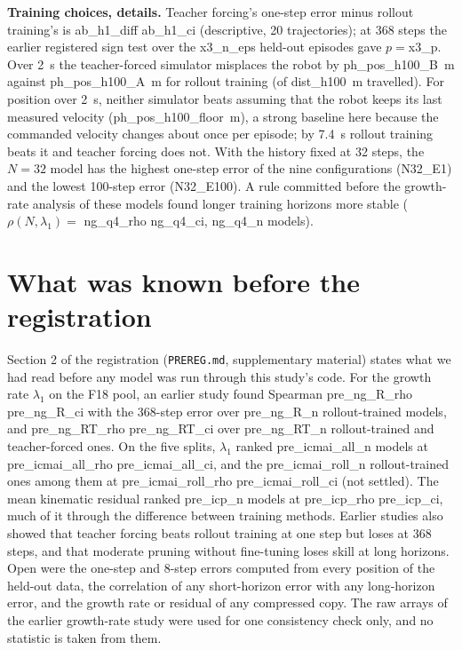 \textbf{Training choices, details.} Teacher forcing's one-step error minus rollout training's is {{ab_h1_diff}}
{{ab_h1_ci}} (descriptive, 20 trajectories); at 368 steps the earlier registered sign test over the
{{x3_n_eps}} held-out episodes gave $p={}${{x3_p}}. Over 2~s the teacher-forced simulator misplaces the robot by
{{ph_pos_h100_B}}~m against {{ph_pos_h100_A}}~m for rollout training (of {{dist_h100}}~m travelled). For position over
2~s, neither simulator beats assuming that the robot keeps its last measured velocity ({{ph_pos_h100_floor}}~m), a
strong baseline here because the commanded velocity changes about once per episode; by 7.4~s rollout training beats it
and teacher forcing does not. With the history fixed at 32 steps, the $N=32$ model has the highest one-step error of
the nine configurations ({{N32_E1}}) and the lowest 100-step error ({{N32_E100}}). A rule committed before the
growth-rate analysis of these models found longer training horizons more stable ($\rho(N,\lambda_1)=$ {{ng_q4_rho}}
{{ng_q4_ci}}, {{ng_q4_n}} models).

\FloatBarrier
\section{What was known before the registration}\label{app:A2}
Section 2 of the registration (\texttt{PREREG.md}, supplementary material) states what we had read before any model was run through this study's code.
For the growth rate $\lambda_1$ on the F18 pool, an earlier study found Spearman {{pre_ng_R_rho}} {{pre_ng_R_ci}}
with the 368-step error over {{pre_ng_R_n}} rollout-trained models, and {{pre_ng_RT_rho}} {{pre_ng_RT_ci}} over
{{pre_ng_RT_n}} rollout-trained and teacher-forced ones. On the five splits, $\lambda_1$ ranked {{pre_icmai_all_n}} models at
{{pre_icmai_all_rho}} {{pre_icmai_all_ci}}, and the {{pre_icmai_roll_n}} rollout-trained ones among them at
{{pre_icmai_roll_rho}} {{pre_icmai_roll_ci}} (not settled). The mean kinematic residual ranked {{pre_icp_n}} models at
{{pre_icp_rho}} {{pre_icp_ci}}, much of it through the difference between training methods. Earlier studies also
showed that teacher forcing beats rollout training at one step but loses at 368 steps, and that moderate pruning
without fine-tuning loses skill at long horizons.
Open were the one-step and 8-step errors computed from every position of the held-out data, the correlation of any
short-horizon error with any long-horizon error, and the growth rate or residual of any compressed copy. The raw
arrays of the earlier growth-rate study were used for one consistency check only, and no statistic is taken from them.

